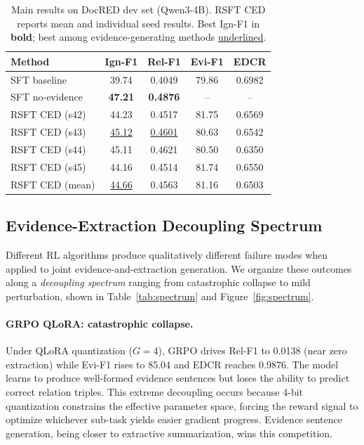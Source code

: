 \begin{table}[t]
\centering
\caption{Main results on DocRED dev set (Qwen3-4B). RSFT CED reports mean and individual seed results. Best Ign-F1 in \textbf{bold}; best among evidence-generating methods \underline{underlined}.}
\label{tab:main}
\small
\begin{tabular}{lcccc}
\toprule
\textbf{Method} & \textbf{Ign-F1} & \textbf{Rel-F1} & \textbf{Evi-F1} & \textbf{EDCR} \\
\midrule
SFT baseline & 39.74 & 0.4049 & 79.86 & 0.6982 \\
SFT no-evidence & \textbf{47.21} & \textbf{0.4876} & -- & -- \\
\midrule
RSFT CED (s42) & 44.23 & 0.4517 & 81.75 & 0.6569 \\
RSFT CED (s43) & \underline{45.12} & \underline{0.4601} & 80.63 & 0.6542 \\
RSFT CED (s44) & 45.11 & 0.4621 & 80.50 & 0.6350 \\
RSFT CED (s45) & 44.16 & 0.4514 & 81.74 & 0.6550 \\
\midrule
RSFT CED (mean) & \underline{44.66} & 0.4563 & 81.16 & 0.6503 \\
\bottomrule
\end{tabular}
\end{table}


\subsection{Evidence-Extraction Decoupling Spectrum}
\label{sec:spectrum}

Different RL algorithms produce qualitatively different failure modes when applied to joint evidence-and-extraction generation. We organize these outcomes along a \emph{decoupling spectrum} ranging from catastrophic collapse to mild perturbation, shown in Table~\ref{tab:spectrum} and Figure~\ref{fig:spectrum}.

\paragraph{GRPO QLoRA: catastrophic collapse.}
Under QLoRA quantization ($G{=}4$), GRPO drives Rel-F1 to 0.0138 (near zero extraction) while Evi-F1 rises to 85.04 and EDCR reaches 0.9876. The model learns to produce well-formed evidence sentences but loses the ability to predict correct relation triples. This extreme decoupling occurs because 4-bit quantization constrains the effective parameter space, forcing the reward signal to optimize whichever sub-task yields easier gradient progress. Evidence sentence generation, being closer to extractive summarization, wins this competition.

